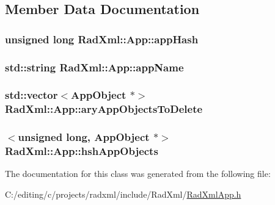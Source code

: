 \subsection{Member Data Documentation}
\hypertarget{class_rad_xml_1_1_app_ae55443ee2535fb62c3dff31850e9cc19}{
\subsubsection[{app\-Hash}]{\setlength{\rightskip}{0pt plus 5cm}unsigned long Rad\-Xml\-::\-App\-::app\-Hash\hspace{0.3cm}{\ttfamily [protected]}}}\label{class_rad_xml_1_1_app_ae55443ee2535fb62c3dff31850e9cc19}
\hypertarget{class_rad_xml_1_1_app_aa0dbd3bf343f87c865df05146acfc888}{
\subsubsection[{app\-Name}]{\setlength{\rightskip}{0pt plus 5cm}std\-::string Rad\-Xml\-::\-App\-::app\-Name\hspace{0.3cm}{\ttfamily [protected]}}}\label{class_rad_xml_1_1_app_aa0dbd3bf343f87c865df05146acfc888}
\hypertarget{class_rad_xml_1_1_app_a5bb4564789162da0566759070a5b2512}{
\subsubsection[{ary\-App\-Objects\-To\-Delete}]{\setlength{\rightskip}{0pt plus 5cm}std\-::vector$<${\bf App\-Object} $\ast$$>$ Rad\-Xml\-::\-App\-::ary\-App\-Objects\-To\-Delete\hspace{0.3cm}{\ttfamily [protected]}}}\label{class_rad_xml_1_1_app_a5bb4564789162da0566759070a5b2512}
\hypertarget{class_rad_xml_1_1_app_a9ebc492df32690f71a04ced6973988cd}{
\subsubsection[{hsh\-App\-Objects}]{$<$unsigned long, {\bf App\-Object} $\ast$$>$ Rad\-Xml\-::\-App\-::hsh\-App\-Objects\hspace{0.3cm}{\ttfamily [protected]}}}\label{class_rad_xml_1_1_app_a9ebc492df32690f71a04ced6973988cd}


The documentation for this class was generated from the following file\-:\begin{DoxyCompactItemize}
\item 
C\-:/editing/c/projects/radxml/include/\-Rad\-Xml/\hyperlink{_rad_xml_app_8h}{Rad\-Xml\-App.\-h}\end{DoxyCompactItemize}
